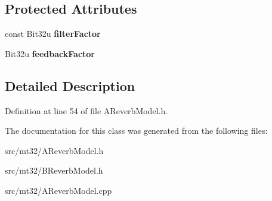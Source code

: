 \subsection*{Protected Attributes}
\begin{DoxyCompactItemize}
\item 
\hypertarget{classMT32Emu_1_1CombFilter_a98aca19d1bb90fb974ff21283695a7e4}{const Bit32u {\bfseries filter\-Factor}}\label{classMT32Emu_1_1CombFilter_a98aca19d1bb90fb974ff21283695a7e4}

\item 
\hypertarget{classMT32Emu_1_1CombFilter_a1fd0fe383ca82d8b7f4091b323c17f24}{Bit32u {\bfseries feedback\-Factor}}\label{classMT32Emu_1_1CombFilter_a1fd0fe383ca82d8b7f4091b323c17f24}

\end{DoxyCompactItemize}


\subsection{Detailed Description}


Definition at line 54 of file A\-Reverb\-Model.\-h.



The documentation for this class was generated from the following files\-:\begin{DoxyCompactItemize}
\item 
src/mt32/A\-Reverb\-Model.\-h\item 
src/mt32/B\-Reverb\-Model.\-h\item 
src/mt32/A\-Reverb\-Model.\-cpp\end{DoxyCompactItemize}
